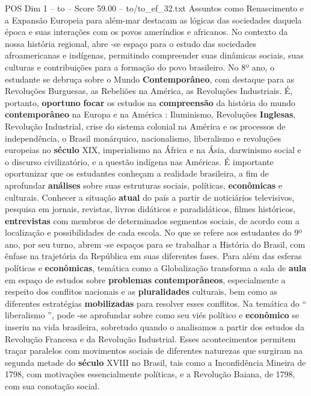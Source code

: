 \begin{textsample}{POS Dim 1 – to – Score 59.00 – to/to\_ef\_32.txt}
Assuntos como Renascimento e a Expansão Europeia para além-mar destacam as lógicas das sociedades daquela época e suas interações com os povos ameríndios e africanos.
No contexto da nossa história regional, abre -se espaço para o estudo das sociedades afroamericanas e indígenas, permitindo compreender suas dinâmicas sociais, suas culturas e contribuições para a formação do povo brasileiro.
No 8º ano, o estudante se debruça sobre o Mundo \textbf{Contemporâneo}, com destaque para as Revoluções Burguesas, as Rebeliões na América, as Revoluções Industriais.
É, portanto, \textbf{oportuno} \textbf{focar} os estudos na \textbf{compreensão} da história do mundo \textbf{contemporâneo} na Europa e na América : Iluminismo, Revoluções \textbf{Inglesas}, Revolução Industrial, crise do sistema colonial na América e os processos de independência, o Brasil monárquico, nacionalismo, liberalismo e revoluções europeias no \textbf{século} XIX, imperialismo na África e na Ásia, darwinismo social e o discurso civilizatório, e a questão indígena nas Américas.
É importante oportunizar que os estudantes conheçam a realidade brasileira, a fim de aprofundar \textbf{análises} sobre suas estruturas sociais, políticas, \textbf{econômicas} e culturais.
Conhecer a situação \textbf{atual} do país a partir de noticiários televisivos, pesquisa em jornais, revistas, livros didáticos e paradidáticos, filmes históricos, \textbf{entrevistas} com membros de determinados segmentos sociais, de acordo com a localização e possibilidades de cada escola.
No que se refere aos estudantes do 9º ano, por seu turno, abrem -se espaços para se trabalhar a História do Brasil, com ênfase na trajetória da República em suas diferentes fases.
Para além das esferas políticas e \textbf{econômicas}, temática como a Globalização transforma a sala de \textbf{aula} em espaço de estudos sobre \textbf{problemas} \textbf{contemporâneos}, especialmente a respeito dos conflitos nacionais e as \textbf{pluralidades} culturais, bem como as diferentes estratégias \textbf{mobilizadas} para resolver esses conflitos.
Na temática do “ liberalismo ”, pode -se aprofundar sobre como seu viés político e \textbf{econômico} se inseriu na vida brasileira, sobretudo quando o analisamos a partir dos estudos da Revolução Francesa e da Revolução Industrial.
Esses acontecimentos permitem traçar paralelos com movimentos sociais de diferentes naturezas que surgiram na segunda metade do \textbf{século} XVIII no Brasil, tais como a Inconfidência Mineira de 1798, com motivações essencialmente políticas, e a Revolução Baiana, de 1798, com sua conotação social.

\end{textsample}
